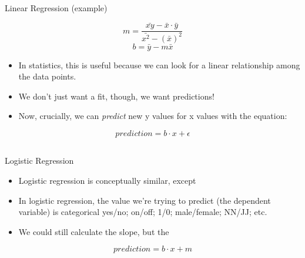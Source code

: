 \documentclass[9pt,xcolor=pdftex,dvipsnames,table]{beamer}
\begin{document}
\subsection{}
\begin{frame}{Linear Regression (example)}
    
	\begin{equation*} m = \frac{\bar{xy} - \bar{x} \cdot \bar{y}}{\bar{x^2} - (\bar{x})^2}\end{equation*}
	\vspace{.5cm}
	\begin{equation*} b = \bar{y} - m\bar{x}\end{equation*}

	\begin{itemize}
		\item In statistics, this is useful because we can look for a linear relationship among the data points.
		\item We don't just want a fit, though, we want predictions!
		\item Now, crucially, we can \emph{predict} new y values for x values with the equation:
	\end{itemize}
	
	\vspace{.5cm}
	
	\begin{equation*} prediction = b \cdot x + \epsilon \end{equation*}
\end{frame}

\subsection{}
\begin{frame}{Logistic Regression}

	\begin{itemize}
		\item Logistic regression is conceptually similar, except
		\item In logistic regression, the value we're trying to predict (the dependent variable) is categorical yes/no; on/off; 1/0; male/female; NN/JJ; etc.
		\item We could still calculate the slope, but the 
	\end{itemize}
	
	\vspace{.5cm}
	
	\begin{equation*} prediction = b \cdot x + m \end{equation*}
\end{frame}
\end{document}
